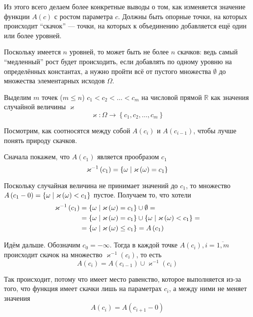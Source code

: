 Из этого всего делаем более конкретные выводы о том,
как изменяется значение функции $A\left( c \right)$ с ростом параметра $c$.
Должны быть опорные точки, на которых происходит ``скачок'' ---
точки, на которых к объединению добавляется ещё один или более уровней.

Поскольку имеется $n$ уровней, то может быть не более $n$ скачков:
ведь самый ``медленный'' рост будет происходить,
если добавлять по одному уровню на определённых константах,
а нужно пройти всё от пустого множества $\emptyset$
до множества элементарных исходов $\Omega$.

Выделим $m$ точек ($m \le n$) $c_1<c_2<\dots<c_m$
на числовой прямой $\mathbb{R}$ как значения случайной величины $\varkappa$
$$\varkappa: \Omega \rightarrow \left\{ c_1, c_2, \dots, c_m \right\}$$

Посмотрим, как соотносятся между собой
$A\left( c_i \right)$ и $A\left( c_{i-1} \right)$,
чтобы лучше понять природу скачков.

Сначала покажем, что $A\left( c_1 \right)$ является прообразом $c_1$
$$\varkappa^{-1}\left( c_1 \right)
  = \left\{ \omega \;\middle|\; \varkappa\left( \omega \right) = c_1 \right\}$$

Поскольку случайная величина не принимает значений до $c_1$,
то множество $A\left( c_1-0 \right)
= \left\{ \omega \;\middle|\; \varkappa\left( \omega \right) < c_1 \right\}$ пустое.
Получаем то, что хотели
\begin{align*}
  \varkappa^{-1}\left( c_1 \right)
      &= \left\{ \omega \;\middle|\; \varkappa\left( \omega \right) = c_1 \right\}
      \cup \emptyset = \\
      &= \left\{ \omega \;\middle|\; \varkappa\left( \omega \right) = c_1 \right\}
      \cup \left\{ \omega
          \;\middle|\; \varkappa\left( \omega \right) < c_1 \right\} = \\
      &= \left\{ \omega \;\middle|\; \varkappa\left( \omega \right) \le c_1 \right\}
      = A\left( c_1 \right)
\end{align*}

Идём дальше. Обозначим $c_0 = -\infty$.
Тогда в каждой точке $A\left( c_i \right), i = \overline{1,m}$
происходит скачок на множество $\varkappa^{-1}\left( c_i \right)$, то есть 
$$A\left( c_i \right)
  = A\left( c_{i-1} \right) \cup \varkappa^{-1}\left( c_i \right)$$

Так происходит, потому что имеет место равенство,
которое выполняется из-за того,
что функция имеет скачки лишь на параметрах $c_i$,
а между ними не меняет значения
$$A\left( c_i \right) = A\left( c_{i+1} - 0 \right)$$

